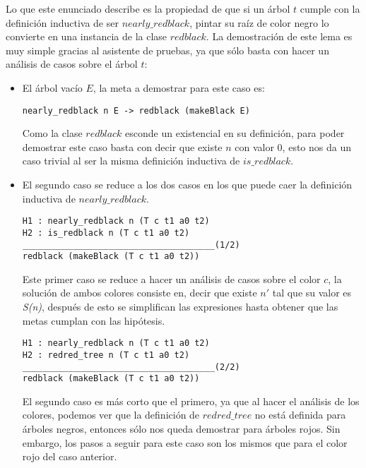 Lo que este enunciado describe es la propiedad de que si un \'arbol $t$ cumple con la definici\'on
inductiva de ser \hyperref[inductive_isRedB]{$nearly\_redblack$}, pintar su raíz de color negro lo 
convierte en una instancia de la clase \hyperref[class_rb]{$redblack$}. La 
demostraci\'on de este 
lema es muy simple gracias al asistente de pruebas, ya que s\'olo basta con hacer un análisis de casos 
sobre el \'arbol $t$:

\begin{itemize}
  \item El \'arbol vac\'io $E$, la meta a demostrar para este caso es:
\begin{verbatim}
nearly_redblack n E -> redblack (makeBlack E)
\end{verbatim}
        Como la clase \hyperref[class_rb]{$redblack$} esconde un existencial en su definici\'on, 
        para poder demostrar este caso basta con decir que existe $n$ con valor 0, esto nos da un 
        caso trivial al ser la misma definici\'on inductiva de 
        \hyperref[inductive_isRedB]{$is\_redblack$}.
  \item El segundo caso se reduce a los dos casos en los que puede caer la definici\'on inductiva
  de \hyperref[inductive_isRedB]{$nearly\_redblack$}.
\begin{verbatim}
H1 : nearly_redblack n (T c t1 a0 t2)
H2 : is_redblack n (T c t1 a0 t2)
______________________________________(1/2)
redblack (makeBlack (T c t1 a0 t2))
\end{verbatim}
        Este primer caso se reduce a hacer un análisis de casos sobre el color $c$, la soluci\'on
        de ambos colores consiste en, decir que existe $n'$ tal que su valor es \textit{S(n)},
        después de esto se simplifican las expresiones hasta obtener que las metas cumplan con las
        hip\'otesis.
\begin{verbatim}
H1 : nearly_redblack n (T c t1 a0 t2)
H2 : redred_tree n (T c t1 a0 t2)
______________________________________(2/2)
redblack (makeBlack (T c t1 a0 t2))
\end{verbatim}
        El segundo caso es m\'as corto que el primero, ya que al hacer el análisis de los colores,
        podemos ver que la definición de \hyperref[inductive_isRedB]{$redred\_tree$} no est\'a 
        definida para \'arboles negros, entonces s\'olo nos queda demostrar para \'arboles rojos. Sin 
        embargo, los pasos a seguir para este caso son los mismos que para el color rojo del caso 
        anterior.
\end{itemize}

